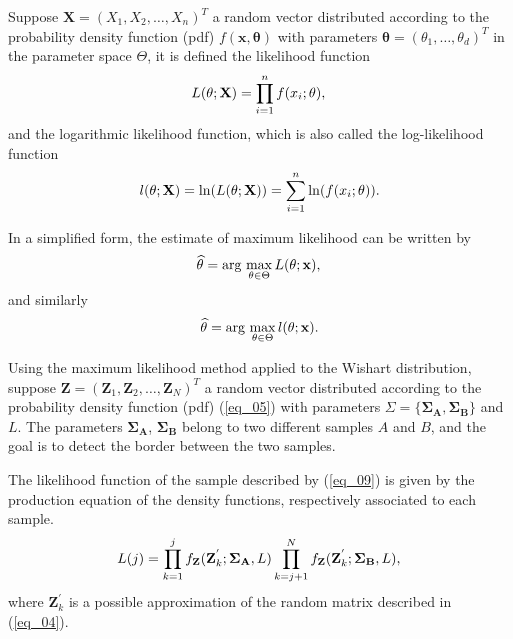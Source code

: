 \documentclass[conference]{IEEEtran}
\begin{document}
{{{{Suppose $\mathbf{X}=(X_1,X_2,\dots,X_n)^T$ a random vector distributed according to the probability density function (pdf) $f(\mathbf{x},\mathbf{\theta})$ with parameters $\mathbf{\theta}=(\theta_1,\dots,\theta_d)^T$ in the parameter space $\Theta$, it is defined the likelihood function  
\begin{equation*}
    L(\theta;\mathbf{X}) = \prod_{i=1}^{n}f(x_i;\theta), \\
\end{equation*}
and the logarithmic likelihood function, which is also called the log-likelihood function
\begin{equation}\label{eq_09}
	l(\theta;\mathbf{X})= \ln(L(\theta;\mathbf{X})) = \sum_{i=1}^{n}\ln(f(x_i;\theta)). \\
\end{equation}

In a simplified form, the estimate of maximum likelihood can be written by 
\begin{equation*}
    \widehat{\theta}= \text{arg}\,\max\limits_{\theta\in\Theta}L(\theta;\mathbf{x}),\\
\end{equation*}
and similarly
\begin{equation*}
    \widehat{\theta}= \text{arg}\,\max\limits_{\theta\in\Theta}l(\theta;\mathbf{x}).\\
\end{equation*}

Using the maximum likelihood method applied to the Wishart distribution, suppose $\mathbf{Z}=(\mathbf{Z}_1,\mathbf{Z}_2,\dots,\mathbf{Z}_N)^T$ a random vector distributed according to the probability density function (pdf) (\ref{eq_05}) with parameters $\Sigma=\{\mathbf{\Sigma_A}, \mathbf{\Sigma_B}\}$ and $L$. The parameters $\mathbf{\Sigma_A}$, $\mathbf{\Sigma_B}$ belong to two different samples $A$ and $B$, and the goal is to detect the border between the two samples.

The likelihood function of the sample described by (\ref{eq_09}) is given by the production equation of the density functions, respectively associated to each sample.
\begin{equation}\label{eq_10}
	L(j)=\prod_{k=1}^{j}f_{\mathbf{Z}}(\mathbf{Z}_{k}^{'};\mathbf{\Sigma_{A}},L) \prod_{k=j+1}^{N}f_{\mathbf{Z}}(\mathbf{Z}_{k}^{'};\mathbf{\Sigma_{B}},L), \\
\end{equation}
where $\mathbf{Z}_{k}^{'}$ is a possible approximation of the random matrix described in (\ref{eq_04}).

}}}}
\end{document}
